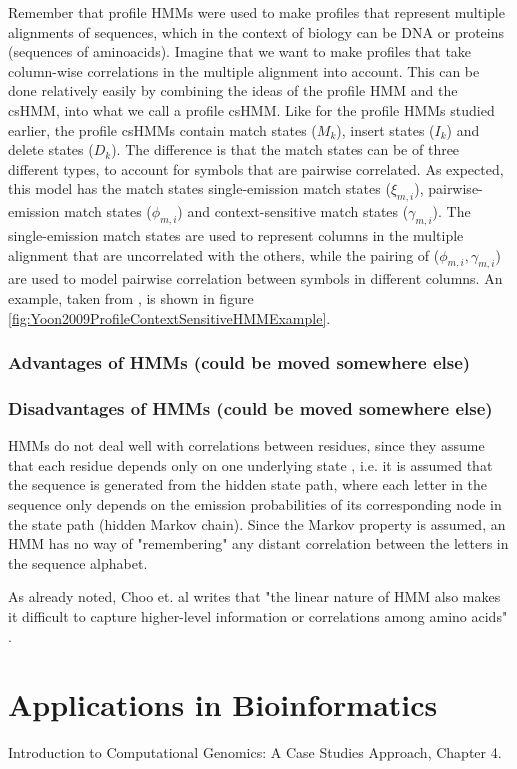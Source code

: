 \documentclass{article}
\begin{document}
Remember that profile HMMs were used to make profiles that represent multiple alignments of sequences, which in the context of biology can be DNA or proteins (sequences of aminoacids). Imagine that we want to make profiles that take column-wise correlations in the multiple alignment into account. This can be done relatively easily by combining the ideas of the profile HMM and the csHMM, into what we call a profile csHMM. Like for the profile HMMs studied earlier, the profile csHMMs contain match states ($M_k$), insert states ($I_k$) and delete states ($D_k$). The difference is that the match states can be of three different types, to account for symbols that are pairwise correlated. As expected, this model has the match states single-emission match states ($\xi_{m,i}$),  pairwise-emission match states ($\phi_{m,i}$) and context-sensitive match states ($\gamma_{m,i}$). The single-emission match states are used to represent columns in the multiple alignment that are uncorrelated with the others, while the pairing of ($\phi_{m,i}, \gamma_{m,i}$) are used to model pairwise correlation between symbols in different columns. An example, taken from \cite{Yoon2009}, is shown in figure \ref{fig:Yoon2009ProfileContextSensitiveHMMExample}.


\subsubsection{Advantages of HMMs (could be moved somewhere else)}

\subsubsection{Disadvantages of HMMs (could be moved somewhere else)}
HMMs do not deal well with correlations between residues, since they assume that each residue depends only on one underlying state \cite{Eddy04}, i.e. it is assumed that the sequence is generated from the hidden state path, where each letter in the sequence only depends on the emission probabilities of its corresponding node in the state path (hidden Markov chain). Since the Markov property is assumed, an HMM has no way of "remembering" any distant correlation between the letters in the sequence alphabet. 

As already noted, Choo et. al writes that "the linear nature of HMM also makes it difficult to capture higher-level information or correlations among amino acids" \cite{Choo2004}.

\section{Applications in Bioinformatics}
Introduction to Computational Genomics: A Case Studies Approach, Chapter 4. 
\end{document}
